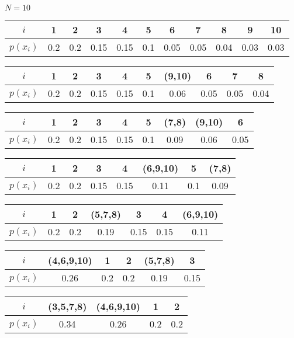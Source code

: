 \documentclass[mfit.tex]{subfiles}
\begin{document}
\begin{ex}
  $N = 10$
  
  
  \begin{tabular}{|c|c|c|c|c|c|c|c|c|c|c|}
  \hline 
  $i$ & 1 & 2 & 3 & 4 & 5 & 6 & 7 & 8 & 9 & 10 \\
  \hline 
  $p(x_i)$ & 0.2 & 0.2 & 0.15 & 0.15 & 0.1 & 0.05 & 0.05 & 0.04 & 0.03 & 0.03 \\
  \hline 
  \end{tabular} 
  
  \begin{tabular}{|c|c|c|c|c|c|c|c|c|c|}
  \hline 
  $i$ & 1 & 2 & 3 & 4 & 5 & (9,10) & 6 & 7 & 8 \\ 
  \hline 
  $p(x_i)$ & 0.2 & 0.2 & 0.15 & 0.15 & 0.1 & 0.06 & 0.05 & 0.05 & 0.04 \\ 
  \hline 
  \end{tabular} 
  
  \begin{tabular}{|c|c|c|c|c|c|c|c|c|}
  \hline 
  $i$ & 1 & 2 & 3 & 4 & 5 & (7,8) & (9,10) & 6 \\
  \hline
  $p(x_i)$ & 0.2 & 0.2 & 0.15 & 0.15 & 0.1 & 0.09 & 0.06 & 0.05 \\
  \hline 
  \end{tabular} 
  
  \begin{tabular}{|c|c|c|c|c|c|c|c|}
  \hline 
  $i$ & 1 & 2 & 3 & 4 & (6,9,10) & 5 & (7,8) \\ 
  \hline 
  $p(x_i)$ & 0.2 & 0.2 & 0.15 & 0.15 & 0.11 & 0.1 & 0.09 \\ 
  \hline 
  \end{tabular} 

  \begin{tabular}{|c|c|c|c|c|c|c|}
  \hline 
  $i$ & 1 & 2 & (5,7,8) & 3 & 4 & (6,9,10) \\ 
  \hline 
  $p(x_i)$ & 0.2 & 0.2 & 0.19 & 0.15 & 0.15 & 0.11 \\ 
  \hline 
  \end{tabular} 

  \begin{tabular}{|c|c|c|c|c|c|}
  \hline 
  $i$ & (4,6,9,10) & 1 & 2 & (5,7,8) & 3 \\ 
  \hline 
  $p(x_i)$ & 0.26 & 0.2 & 0.2 & 0.19 & 0.15 \\ 
  \hline 
  \end{tabular} 
  
  \begin{tabular}{|c|c|c|c|c|}
  \hline 
  $i$ & (3,5,7,8) & (4,6,9,10) & 1 & 2 \\ 
  \hline 
  $p(x_i)$ & 0.34 & 0.26 & 0.2 & 0.2 \\ 
  \hline 
  \end{tabular} 


\end{ex}
\end{document}
